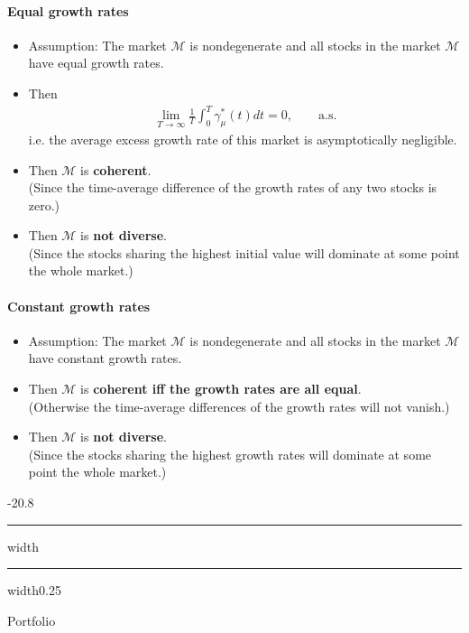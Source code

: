 \documentclass[a4paper,landscape,8pt,fleqn]{scrartcl}
\makeatletter
\renewcommand{\emph}[1]{\textbf{#1}}
\renewcommand{\section}{\@startsection{section}{1}{0mm}%
{-2\baselineskip}{0.8\baselineskip}%
{\hrule depth 0.2pt width\columnwidth\hrule depth1.5pt
width0.25\columnwidth\vspace*{1.2em}\Large\bfseries}}
\makeatother
\begin{document}
\begin{multicols*}{3}
\paragraph{Equal growth rates}

\begin{itemize}
\item Assumption: The market $\mathcal{M}$ is nondegenerate and all stocks in the market $\mathcal{M}$ have equal growth rates.
\item Then
\begin{align*}
\lim\limits_{T \to \infty} \frac{1}{T} \int_0^T \gamma_\mu^\ast(t) dt = 0, \qquad \text{a.s.}
\end{align*}
i.e. the average excess growth rate of this market is asymptotically negligible.
\item Then $\mathcal{M}$ is \emph{coherent}. \\
(Since the time-average difference of the growth rates of any two stocks is zero.)
\item Then $\mathcal{M}$ is \emph{not diverse}. \\
(Since the stocks sharing the highest initial value will dominate at some point the whole market.)
\end{itemize}

\paragraph{Constant growth rates}

\begin{itemize}
\item Assumption: The market $\mathcal{M}$ is nondegenerate and all stocks in the market $\mathcal{M}$ have constant growth rates.
\item Then $\mathcal{M}$ is \emph{coherent iff the growth rates are all equal}. \\
(Otherwise the time-average differences of the growth rates will not vanish.)
\item Then $\mathcal{M}$ is \emph{not diverse}. \\
(Since the stocks sharing the highest growth rates will dominate at some point the whole market.)
\end{itemize}

\columnbreak

\section{Portfolio}


\end{multicols*}
\end{document}
